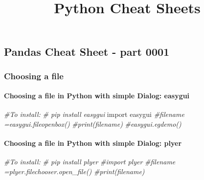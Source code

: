\documentclass[
]{article}
\title{Python Cheat Sheets}
\author{}
\date{\vspace{-2.5em}}
\newenvironment{Shaded}{\begin{snugshade}}{\end{snugshade}}
\newcommand{\CommentTok}[1]{\textcolor[rgb]{0.56,0.35,0.01}{\textit{#1}}}
\newcommand{\ImportTok}[1]{#1}
\newcommand{\NormalTok}[1]{#1}
\begin{document}
\maketitle

\hypertarget{pandas-cheat-sheet---part-0001}{%
\subsection{\texorpdfstring{{ Pandas Cheat Sheet - part 0001
}}{ Pandas Cheat Sheet - part 0001 }}\label{pandas-cheat-sheet---part-0001}}

\hypertarget{choosing-a-file}{%
\subsubsection{Choosing a file}\label{choosing-a-file}}

\hypertarget{choosing-a-file-in-python-with-simple-dialog-easygui}{%
\paragraph{\texorpdfstring{{ Choosing a file in Python with simple
Dialog: easygui
}}{ Choosing a file in Python with simple Dialog: easygui }}\label{choosing-a-file-in-python-with-simple-dialog-easygui}}

\begin{Shaded}
\begin{Highlighting}[]
\CommentTok{\#To install:}
\CommentTok{\# pip install easygui}
\ImportTok{import}\NormalTok{ easygui}
\CommentTok{\#filename =easygui.fileopenbox()}
\CommentTok{\#print(filename)}
\CommentTok{\#easygui.egdemo()}
\end{Highlighting}
\end{Shaded}

\hypertarget{choosing-a-file-in-python-with-simple-dialog-plyer}{%
\paragraph{\texorpdfstring{{ Choosing a file in Python with simple
Dialog: plyer
}}{ Choosing a file in Python with simple Dialog: plyer }}\label{choosing-a-file-in-python-with-simple-dialog-plyer}}

\begin{Shaded}
\begin{Highlighting}[]
\CommentTok{\#To install:}
\CommentTok{\# pip install plyer}
\CommentTok{\#import plyer }
\CommentTok{\#filename =plyer.filechooser.open\_file()}
\CommentTok{\#print(filename)}
\end{Highlighting}
\end{Shaded}
\end{document}
